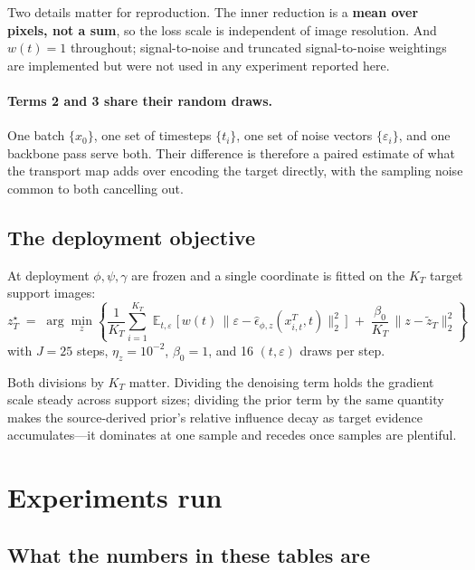 \documentclass[11pt]{article}
\newcommand{\KT}{K_{T}}
\newcommand{\epshat}{\hat{\epsilon}}
\newcommand{\ztilT}{\tilde{z}_{T}}
\newcommand{\zstarT}{z^{\star}_{T}}
\begin{document}
Two details matter for reproduction. The inner reduction is a \textbf{mean over pixels, not a
sum}, so the loss scale is independent of image resolution. And $w(t)=1$ throughout;
signal-to-noise and truncated signal-to-noise weightings are implemented but were not used in any
experiment reported here.

\paragraph{Terms 2 and 3 share their random draws.}
One batch $\{x_0\}$, one set of timesteps $\{t_i\}$, one set of noise vectors
$\{\varepsilon_i\}$, and one backbone pass serve both. Their difference is therefore a paired
estimate of what the transport map adds over encoding the target directly, with the sampling noise
common to both cancelling out.

\subsection{The deployment objective}

At deployment $\phi,\psi,\gamma$ are frozen and a single coordinate is fitted on the $\KT$ target
support images:
\begin{equation}
\zstarT \;=\; \arg\min_{z} \left\{
  \frac{1}{\KT}\sum_{i=1}^{\KT}
  \mathop{\mathbb{E}}_{t,\varepsilon}\Big[\, w(t)\,\big\| \varepsilon
    - \epshat_{\phi,z}(x^{T}_{i,t},t) \big\|_2^2 \,\Big]
  \;+\; \frac{\beta_0}{\KT}\,\big\| z - \ztilT \big\|_2^2
\right\}
\label{eq:refine-u}
\end{equation}
with $J=25$ steps, $\eta_z=10^{-2}$, $\beta_0=1$, and 16 $(t,\varepsilon)$ draws per step.

Both divisions by $\KT$ matter. Dividing the denoising term holds the gradient scale steady across
support sizes; dividing the prior term by the same quantity makes the source-derived prior's
relative influence decay as target evidence accumulates---it dominates at one sample and recedes
once samples are plentiful.

\section{Experiments run}
\label{sec:experiments}

\subsection{What the numbers in these tables are}
\end{document}
